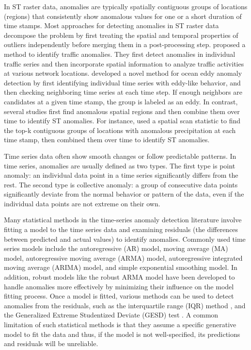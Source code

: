 \documentclass[11pt]{article}
\begin{document}
In ST raster data, anomalies are typically spatially contiguous groups of locations (regions) that consistently show anomalous values for one or a short duration of time stamps. Most approaches for detecting anomalies in ST raster data decompose the problem by first treating the spatial and temporal properties of outliers independently before merging them in a post-processing step. \citet{paschalidis2008spatio} proposed a method to identify traffic anomalies. They first detect anomalies in individual traffic series and then incorporate spatial information to analyze traffic activities at various network locations. \citet{faghmous2012novel} developed a novel method for ocean eddy anomaly detection by first identifying individual time series with eddy-like behavior, and then checking neighboring time series at each time step. If enough neighbors are candidates at a given time stamp, the group is labeled as an eddy. In contrast, several studies first find anomalous spatial regions and then combine them over time to identify ST anomalies. For instance, \citet{wu2010spatio} used a spatial scan statistic to find the top-k contiguous groups of locations with anomalous precipitation at each time stamp, then combined them over time to identify ST anomalies.





Time series data often show smooth changes or follow predictable patterns. In time series, anomalies are usually defined as two types. The first type is point anomaly: an individual data point in a time series significantly differs from the rest. The second type is collective anomaly: a group of consecutive data points significantly deviate from the normal behavior or pattern of the data, even if the individual data points are not extreme on their own. 

Many statistical methods in the time-series anomaly detection literature involve fitting a model to the time series data and examining residuals (the differences between predicted and actual values) to identify anomalies. Commonly used time series models include the autoregressive (AR) model, moving average (MA) model, autoregressive moving average (ARMA) model, autoregressive integrated moving average (ARIMA) model, and simple exponential smoothing model. In addition, robust models like the robust ARMA model \citep{muler2009robust} have been developed to handle anomalies more effectively by minimizing their influence on the model fitting process. Once a model is fitted, various methods can be used to detect anomalies from the residuals, such as the interquartile range (IQR) method \citep{IQR}, and the Generalized Extreme Studentized Deviate (GESD) test \citep{rosner1983percentage}. A common limitation of such statistical methods is that they assume a specific generative model to fit the data and thus, if the model is not well-specified, its predictions and residuals will be unreliable. 
\end{document}
